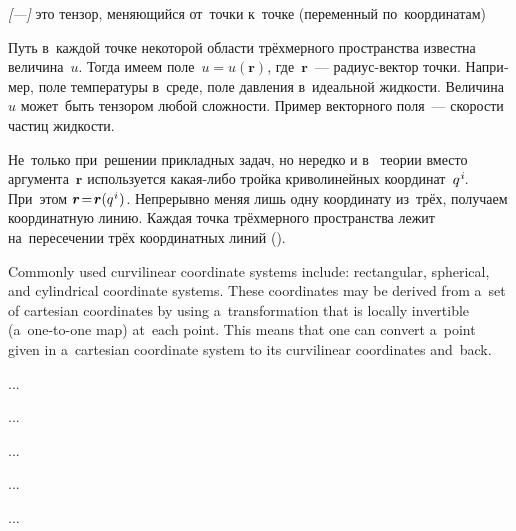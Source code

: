 

\begin{otherlanguage}{russian}

\begin{changemargin}{\parindent}{\parindent}
\vspace{-0.15em}
\small \flushright \textit{[---]} это тензор, меняющийся от~точки к~точке (переменный по~координатам)
\par\vspace{.25em}
\end{changemargin}

\noindent Путь в~каждой точке некоторой области трёхмерного пространства
известна величина~$u$. Тогда имеем поле~${u \!=\! u(\bm{r})}$, где~$\bm{r}$~--- радиус\hbox{-}вектор точки. Например, поле температуры в~среде, поле давления в~идеальной жидкости. Величина~$u$ может~быть тензором любой сложности. Пример векторного поля~--- скорости частиц жидкости.

\end{otherlanguage}



\begin{otherlanguage}{russian}

Не~только при~решении прикладных задач, но нередко и в~ тео\-рии вместо аргумента~$\bm{r}$ ис\-поль\-зу\-ет\-ся какая-либо трой\-ка криво\-линей\-ных координат~${q^{\hspace{.1ex}i}\hspace{-0.2ex}}$. При~этом ${\bm{r} \!=\! \bm{r}(q^{\hspace{.1ex}i}\hspace{.1ex})}$. Непрерывно меняя лишь одну координату из~трёх, получаем координатную линию. Каждая точка трёхмерного пространства лежит на~пересечении трёх координатных линий ().

{\small
Commonly used curvilinear coordinate systems include: rectangular, spherical, and cylindrical coordinate systems. These coordinates may be derived from a~set of cartesian coordinates by using a~transformation that is locally invertible (a~one-to-one map) at~each point. This means that one can convert a~point given in a~cartesian coordinate system to its curvilinear coordinates and~back.
\par}

...

\newpage ...

\newpage ...

\newpage ...

\newpage ...



\end{otherlanguage}

